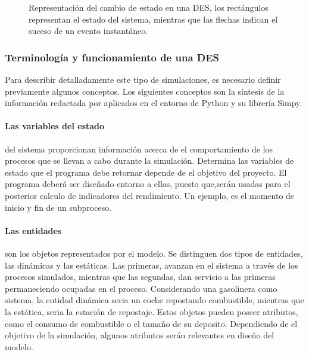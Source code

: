 \begin{figure}[h]
	\begin{center}
		
	\end{center}
	\caption{Representación del cambio de estado en una DES,
	los rectángulos representan el estado del sistema,
	mientras que las flechas indican el suceso de un evento instantáneo.}
	\label{fig:2_fc_simple_ex}
\end{figure}

\subsubsection{Terminología y funcionamiento de una DES}\label{TF_DES}

Para describir detalladamente este tipo de simulaciones,
es necesario definir previamente algunos conceptos.
Los siguientes conceptos
son la síntesis de la información redactada por \citep{banks1998handbook}
aplicados en el entorno de Python y su librería Simpy.

\paragraph{Las variables del estado}
del sistema proporcionan información
acerca de el comportamiento de los procesos
que se llevan a cabo durante la simulación.
Determina las variables de estado que el programa debe retornar
depende de el objetivo del proyecto.
El programa deberá ser diseñado entorno a ellas,
puesto que,serán usadas
para el posterior calculo de indicadores del rendimiento.
Un ejemplo, es el momento de inicio y fin de un subproceso.

\paragraph{Las entidades}
son los objetos representados por el modelo.
Se distinguen dos tipos de entidades,
las dinámicas y las estáticas.
Las primeras, avanzan en el sistema
a través de los procesos simulados, 
mientras que las segundas, dan servicio a las primeras
permaneciendo ocupadas en el proceso.
Considerando una gasolinera como sistema,
la entidad dinámica seria un coche repostando combustible,
mientras que la estática, seria la estación de repostaje.
Estos objetos pueden poseer atributos,
como el consumo de combustible o el tamaño de su deposito.
Dependiendo de el objetivo de la simulación,
algunos atributos serán relevantes en diseño del modelo.

